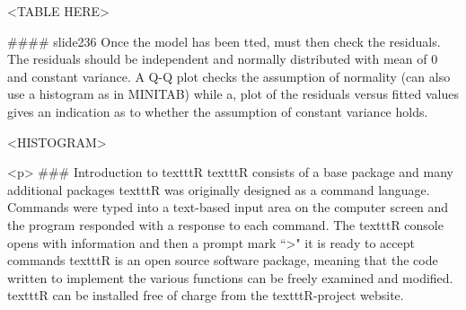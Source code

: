 <TABLE HERE>




#### {slide236}
Once the model has been tted, must then check the residuals.
The residuals should be independent and normally distributed with
mean of 0 and constant variance.
A Q-Q plot checks the assumption of normality (can also use a
histogram as in MINITAB) while a, plot of the residuals versus fitted values gives an indication as to whether the assumption of constant variance holds.

<HISTOGRAM>




<p>
### {Introduction to texttt{R}}
texttt{R} consists of a base package and many additional packages
texttt{R} was originally designed as a command language.  
Commands were typed into a text-based input area on the computer screen and the program responded with a response to each command.
The texttt{R} console opens with information and then a prompt mark  ``>"  it is ready to accept commands
texttt{R}  is an open source software package, meaning that the code written to implement the various functions can be freely examined and modified.
texttt{R} can be installed free of charge from the texttt{R}-project website.




